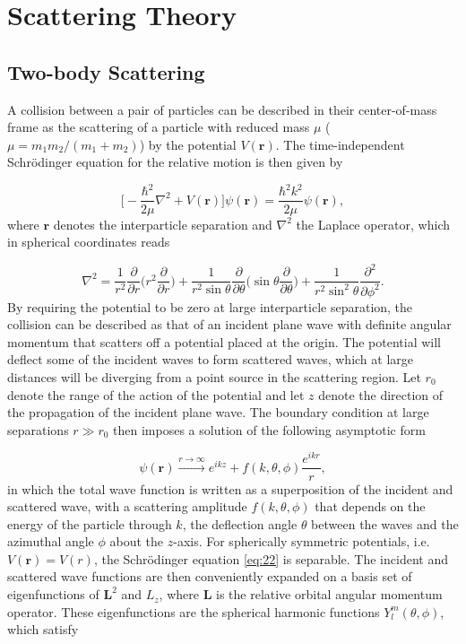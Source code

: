 \chapter{Scattering Theory}\label{chap:3}
\section{Two-body Scattering} \label{Two-body scattering}
A collision between a pair of particles can be described in their center-of-mass frame as the scattering of a particle with reduced mass $\mu$ ($\mu = m_1m_2/(m_1 + m_2)$) by the potential $V(\mathbf{r})$. The time-independent  Schr{\"o}dinger equation for the relative motion is then given by 

\begin{equation} \label{eq:22}
\bigg[-\frac{\hbar^2}{2\mu}\nabla^2 + V(\mathbf{r})\bigg]\psi(\mathbf{r}) = \frac{\hbar^2 k^2}{2 \mu}\psi(\mathbf{r}),
\end{equation}
where $\mathbf{r}$ denotes the interparticle separation and $\nabla^2$ the Laplace operator, which in spherical coordinates reads

\begin{equation} \label{eq:23}
\nabla^2 = \frac{1}{r^2} \frac{\partial}{\partial r} \bigg(r^2 \frac{\partial}{\partial r}\bigg) + \frac{1}{r^2 \sin\theta} \frac{\partial}{\partial\theta} \bigg(\sin\theta \frac{\partial}{\partial\theta}\bigg) + \frac{1}{r^2 \sin^2\theta} \frac{\partial^2}{\partial\phi^2}.
\end{equation}
By requiring the potential to be zero at large interparticle separation, the collision can be described as that of an incident plane wave with definite angular momentum that scatters off a potential placed at the origin. The potential will deflect some of the incident waves to form scattered waves, which at large distances will be diverging from a point source in the scattering region. Let $r_0$ denote the range of the action of the potential and let $z$ denote the direction of the propagation of the incident plane wave. The boundary condition at large separations $r \gg r_0$ then imposes a solution of the following asymptotic form

\begin{equation}\label{eq:26}
\psi(\mathbf{r}) \xrightarrow{r \to \infty} e^{ikz} + f(k,\theta,\phi)\frac{e^{ikr}}{r},
\end{equation}
in which the total wave function is written as a superposition of the incident and scattered wave, with a scattering amplitude $f(k,\theta,\phi)$ that depends on the energy of the particle through $k$, the deflection angle $\theta$ between the waves and the azimuthal angle $\phi$ about the $z$-axis. For spherically symmetric potentials, i.e. $V(\mathbf{r}) = V(r)$, the Schr{\"o}dinger equation \eqref{eq:22} is separable. The incident and scattered wave functions are then conveniently expanded on a basis set of eigenfunctions of $\mathbf{L}^2$ and $L_z$, where $\mathbf{L}$ is the relative orbital angular momentum operator. These eigenfunctions are the spherical harmonic functions $Y_l^m(\theta,\phi)$, which satisfy 

